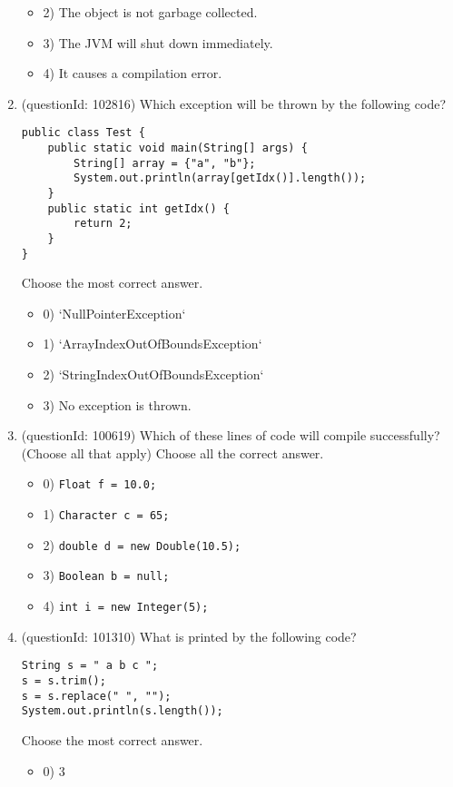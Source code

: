 \documentclass[12pt]{article}
\begin{document}
\begin{enumerate}[label=(\arabic*)]
\begin{itemize}
\item 2) The object is not garbage collected.

\item 3) The JVM will shut down immediately.

\item 4) It causes a compilation error.

\end{itemize}
\item (questionId: 102816) Which exception will be thrown by the following code?
\begin{verbatim}
public class Test {
    public static void main(String[] args) {
        String[] array = {"a", "b"};
        System.out.println(array[getIdx()].length());
    }
    public static int getIdx() {
        return 2;
    }
}
\end{verbatim}
Choose the most correct answer. 
\begin{itemize}
\item 0) `NullPointerException`

\item 1) `ArrayIndexOutOfBoundsException`

\item 2) `StringIndexOutOfBoundsException`

\item 3) No exception is thrown.

\end{itemize}
\item (questionId: 100619) Which of these lines of code will compile successfully? (Choose all that apply)
Choose all the correct answer.\begin{itemize}
\item 0) \verb|Float f = 10.0;|

\item 1) \verb|Character c = 65;|

\item 2) \verb|double d = new Double(10.5);|

\item 3) \verb|Boolean b = null;|

\item 4) \verb|int i = new Integer(5);|

\end{itemize}
\item (questionId: 101310) What is printed by the following code?
\begin{verbatim}
String s = " a b c ";
s = s.trim();
s = s.replace(" ", "");
System.out.println(s.length());
\end{verbatim}
Choose the most correct answer. 
\begin{itemize}
\item 0) 3


\end{itemize}
\end{enumerate}
\end{document}
